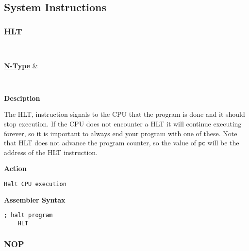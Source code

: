 \subsection{System Instructions}

\subsubsection{HLT }\label{sec:HLT}

\vspace{3ex}

\begin{center}
	\begin{bytefield}[leftcurly=., leftcurlyspace=0pt]{32}
		 \\
		\begin{leftwordgroup}{\hyperref[sec:n-type]{\textbf{N-Type}}}
		 & 
		\end{leftwordgroup}\\
	\end{bytefield}
\end{center}

\textbf{Desciption}

The HLT, instruction signals to the CPU that the program is done and it should stop execution.
If the CPU does not encounter a HLT it will continue executing forever, so it is important to always end your program with one of these.
Note that HLT does not advance the program counter, so the value of \texttt{pc} will be the address of the HLT instruction.

\vspace{3ex}

\textbf{Action}
\begin{lstlisting}[frame=single]
	Halt CPU execution
\end{lstlisting}

\vspace{3ex}

\textbf{Assembler Syntax}
\begin{lstlisting}[frame=single]
	; halt program
	HLT
\end{lstlisting}

\subsubsection{NOP }\label{sec:NOP}

\vspace{3ex}

